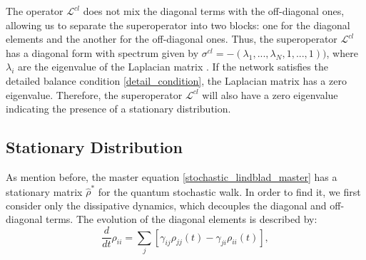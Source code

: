 The operator $\mathcal{L}^{cl}$ does not mix the diagonal terms with the off-diagonal ones, allowing us to separate the superoperator into two blocks: one for the diagonal elements and the another for the off-diagonal ones.
Thus, the superoperator $\mathcal{L}^{cl}$ has a diagonal form with spectrum given by $\sigma^{cl} = -(\lambda_1,...,\lambda_N,1,...,1))$, where $\lambda_i$ are the eigenvalue of the Laplacian matrix \cite{Bruderer_Plenio}.
If the network satisfies the detailed balance condition \eqref{detail_condition}, the Laplacian matrix has a zero eigenvalue. Therefore, the superoperator $\mathcal{L}^{cl}$ will also have a zero eigenvalue indicating the presence of a stationary distribution.

\begin{comment}
    \begin{equation}
    \begin{split}
    \mathcal{L}^{qm}\ket{k}\bra{l} =& -i\hat L\ket{k}\bra{l} + i \ket{k}\bra{l}\hat L\\
    &=\frac{i}{2}\sum_{ij} - L_{ij}\ket{i}\braket{j}{k}\bra{l} + \ket{k}\braket{l}{i}\bra{j}\\
    &=\frac{1}{2}\sum_i -L_{ik} \ket{i}\bra{l} + \sum_i L_{li}\ket{k}\bra{i}\\
\end{split}
\end{equation}

Instead the diagonal terms
\begin{equation}
\begin{split}
\mathcal{L}^{qm}\ket{l}\bra{l} =& -i\hat L\ket{l}\bra{l} + i \ket{l}\bra{l}\hat L\\
&=\frac{i}{2}\sum_{ij} - L_{ij}\ket{i}\braket{j}{l}\bra{l} + \ket{l}\braket{l}{i}\bra{j}\\
&=\frac{1}{2}\sum_i -L_{il} \ket{i}\bra{l} + \sum_i L_{li}\ket{l}\bra{i} = 0\\
\end{split}
\end{equation}
\end{comment}

\subsection{Stationary Distribution}

As mention before, the master equation \eqref{stochastic_lindblad_master} has a stationary matrix $\hat\rho^*$ for the quantum stochastic walk.
In order to find it, we first consider only the dissipative dynamics, which decouples the diagonal and off-diagonal terms. The evolution of the diagonal elements is described by:
\begin{equation}
    \frac{d}{dt}\rho_{ii} = \sum_j\left[\gamma_{ij}\rho_{jj}(t) - \gamma_{ji}\rho_{ii}(t)\right],
\end{equation}

